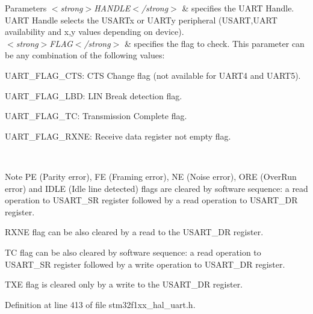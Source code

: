 \begin{DoxyParams}{Parameters}
{\em $<$strong$>$\+H\+A\+N\+D\+L\+E$<$/strong$>$} & specifies the U\+A\+RT Handle. U\+A\+RT Handle selects the U\+S\+A\+R\+Tx or U\+A\+R\+Ty peripheral (U\+S\+A\+RT,U\+A\+RT availability and x,y values depending on device). \\
\hline
{\em $<$strong$>$\+F\+L\+A\+G$<$/strong$>$} & specifies the flag to check. This parameter can be any combination of the following values\+: \begin{DoxyItemize}
\item U\+A\+R\+T\+\_\+\+F\+L\+A\+G\+\_\+\+C\+TS\+: C\+TS Change flag (not available for U\+A\+R\+T4 and U\+A\+R\+T5). \item U\+A\+R\+T\+\_\+\+F\+L\+A\+G\+\_\+\+L\+BD\+: L\+IN Break detection flag. \item U\+A\+R\+T\+\_\+\+F\+L\+A\+G\+\_\+\+TC\+: Transmission Complete flag. \item U\+A\+R\+T\+\_\+\+F\+L\+A\+G\+\_\+\+R\+X\+NE\+: Receive data register not empty flag.\end{DoxyItemize}
\\
\hline
\end{DoxyParams}
\begin{DoxyNote}{Note}
PE (Parity error), FE (Framing error), NE (Noise error), O\+RE (Over\+Run error) and I\+D\+LE (Idle line detected) flags are cleared by software sequence\+: a read operation to U\+S\+A\+R\+T\+\_\+\+SR register followed by a read operation to U\+S\+A\+R\+T\+\_\+\+DR register. 

R\+X\+NE flag can be also cleared by a read to the U\+S\+A\+R\+T\+\_\+\+DR register. 

TC flag can be also cleared by software sequence\+: a read operation to U\+S\+A\+R\+T\+\_\+\+SR register followed by a write operation to U\+S\+A\+R\+T\+\_\+\+DR register. 

T\+XE flag is cleared only by a write to the U\+S\+A\+R\+T\+\_\+\+DR register. 
\end{DoxyNote}


Definition at line 413 of file stm32f1xx\+\_\+hal\+\_\+uart.\+h.

\mbox{\label{group___u_a_r_t___exported___macros_ga1345aa0af53d82269b13835c225e91d0}} 
